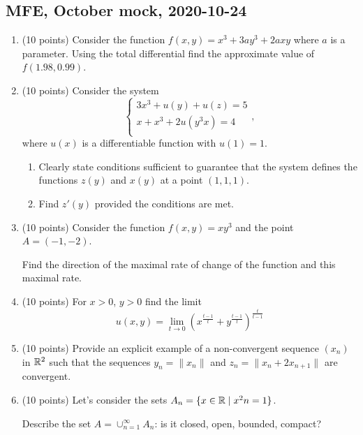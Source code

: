
\subsection{MFE, October mock, 2020-10-24}


\begin{enumerate}

\item (10 points) Consider the function $f(x, y) = x^3 +3a y^3 + 2axy$ where $a$ is a parameter. 
  Using the total differential find the approximate value of $f(1.98, 0.99)$.

  \item (10 points) Consider the system
  \[
  \begin{cases}
  3x^3 + u(y) + u(z) = 5 \\
  x + x^3 + 2u(y^3x) = 4 \\
  \end{cases},
  \]
  where $u(x)$ is a differentiable function with $u(1)=1$. 


  \begin{enumerate}
    \item Clearly state conditions sufficient to guarantee that the system defines the functions $z(y)$ and $x(y)$ at a point $(1, 1, 1)$. 
    \item Find $z'(y)$ provided the conditions are met.
 \end{enumerate}

 \item (10 points) Consider the function $f (x, y) = xy^3$  and the point $A = (−1, −2)$.

 Find the direction of the maximal rate of change of the function and this maximal rate.


\item (10 points) For $x>0$, $y>0$ find the limit 
\[
u(x,y) = \lim_{t\to 0} \left(x^{\frac{t-1}{t}} + y^{\frac{t-1}{t}}  \right)^{\frac{t}{t-1}}
\]

\item (10 points) Provide an explicit example of a non-convergent sequence $(x_n)$ in $\mathbb{R}^2$ 
such that the sequences $y_n = \| x_n \|$ and $z_n = \| x_n  + 2x_{n+1}\|$ are convergent.

\item (10 points) Let's consider the sets $A_n = \{ x\in \mathbb{R} \mid x^2 n = 1\}$.

Describe the set $A = \cup_{n=1}^{\infty} A_n$: is it closed, open, bounded, compact?




\end{enumerate}
